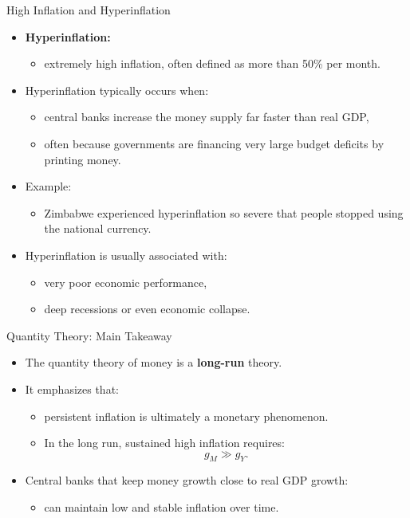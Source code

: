 \documentclass[aspectratio=169]{beamer}
\begin{document}
\begin{frame}{High Inflation and Hyperinflation}
\transfade
\begin{itemize}[<+->]
  \item \textbf{Hyperinflation:}
  \begin{itemize}[<+->]
    \item extremely high inflation, often defined as \alert{more than 50\% per month}.
  \end{itemize}
  \item Hyperinflation typically occurs when:
  \begin{itemize}[<+->]
    \item central banks increase the money supply far faster than real GDP,
    \item often because governments are financing very large budget deficits by printing money.
  \end{itemize}
  \item Example:
  \begin{itemize}[<+->]
    \item Zimbabwe experienced hyperinflation so severe that people stopped using the national currency.
  \end{itemize}
  \item Hyperinflation is usually associated with:
  \begin{itemize}[<+->]
    \item very poor economic performance,
    \item deep recessions or even economic collapse.
  \end{itemize}
\end{itemize}
\end{frame}

\begin{frame}{Quantity Theory: Main Takeaway}
\transfade
\begin{itemize}[<+->]
  \item The quantity theory of money is a \textbf{long-run} theory.
  \item It emphasizes that:
  \begin{itemize}[<+->]
    \item \alert{persistent inflation} is ultimately a monetary phenomenon.
    \item In the long run, sustained high inflation requires:
    \[
      g_{M} \gg g_{Y}.
    \]
  \end{itemize}
  \item Central banks that keep money growth close to real GDP growth:
  \begin{itemize}[<+->]
    \item can maintain low and stable inflation over time.
  \end{itemize}
\end{itemize}
\end{frame}
\end{document}

